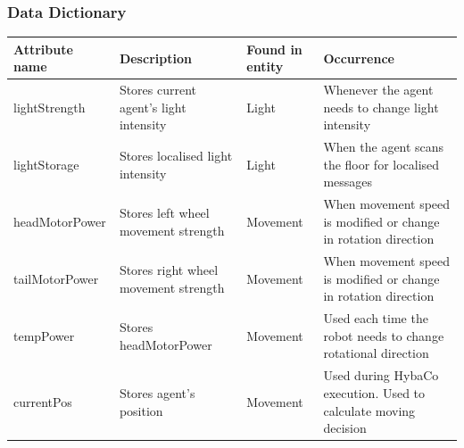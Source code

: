 \begin{landscape}
  \subsubsection{Data Dictionary}
  \begin{tabular}{| p{5cm} | p{4cm} | p{3cm} | p{6cm} |}
    \hline
    Attribute name & Description & Found in entity & Occurrence\\
    \hline
    lightStrength  & Stores current agent's light intensity & Light    &
    Whenever the agent needs to change light intensity              \\
    \hline
    lightStorage   & Stores localised light intensity       & Light    &
    When the agent scans the floor for localised messages           \\
    \hline
    headMotorPower & Stores left wheel movement strength    & Movement &
    When movement speed is modified or change in rotation direction \\
    \hline
    tailMotorPower & Stores right wheel movement strength   & Movement &
    When movement speed is modified or change in rotation direction \\
    \hline
    tempPower      & Stores headMotorPower                  & Movement &
    Used each time the robot needs to change rotational direction   \\
    \hline
    currentPos     & Stores agent's position                & Movement &
    Used during HybaCo execution.  Used to calculate moving decision\\
    \hline  
  \end{tabular}
\end{landscape}
\clearpage

